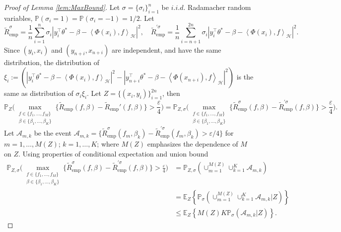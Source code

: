 \documentclass[twoside, onecolumn]{article}
\def\E{\mathbb{E}}
\def\Hcal{\mathcal{H}}
\def\Acal{\mathcal{A}}
\def\Hcal{\mathcal{H}}
\begin{document}
\begin{proof}[Proof of Lemma \ref{lem:MaxBound}]
 Let $\sigma = \{\sigma_i\}_{i=1}^n$ be $i.i.d.$ Radamacher random variables,  $\mathbb{P}(\sigma_i=1)=\mathbb{P}(\sigma_i=-1)=1/2$. Let $$
 \widetilde{R}_{\text{emp}}^{\sigma}=
 \frac{1}{n}\sum_{i=1}^{n}\sigma_{i}|y_i^{\top}\theta^*-\beta-\left<\Phi(x_i),f\right>_\Hcal|^{2}, \quad \widetilde{R}_{\text{emp}}^{'\sigma}=
  \frac{1}{n}\sum_{i=n+1}^{2n}\sigma_{i}|y_i^{\top}\theta^*-\beta-\left<\Phi(x_i),f\right>_\Hcal|^{2}.
 $$
Since $(y_i, x_i)$ and $(y_{n+i}, x_{n+i})$ are independent, and have the same distribution, the distribution of $\xi_{i}:=(|y_{i}^\top \theta^*-\beta-\left<\Phi(x_{i}), f\right>_\Hcal|^{2}-
|y_{n+i}^\top\theta^*-\beta-\left<\Phi(x_{n+i}), f\right>_\Hcal|^{2})$ is the same as distribution of $\sigma_i\xi_i$. Let $Z=\{(x_i, y_i)\}_{i=1}^{2n}$, then
\[
\mathbb{P}_Z\bigg( 
\max_{\substack{f\in \{f_1, \dots, f_M\}\\ \beta\in \{\beta_1, \dots, \beta_K\}}}
\{\widetilde{R}_{\text{emp}}(f,\beta)-\widetilde{R}_{\text{emp}}'(f,\beta)\}>\frac{\varepsilon}{4}
\bigg)=\mathbb{P}_{Z,\sigma}\bigg(\max_{\substack{f\in \{f_1, \dots, f_M\}\\\beta\in \{\beta_1, \dots, \beta_K\}}}\{\widetilde{R}_{\text{emp}}^{\sigma}(f,\beta)-\widetilde{R}_{\text{emp}}^{'\sigma}(f,\beta)\}>\frac{\varepsilon}{4}\bigg).
\]
Let $\Acal_{m,k}$ be the event $\Acal_{m,k} = \{\widetilde{R}_{\text{emp}}^{\sigma}(f_m,\beta_k)-\widetilde{R}_{\text{emp}}^{'\sigma}(f_m,\beta_k) > \varepsilon/4\}$ for $m=1,\dots,M(Z)$; $k=1,\dots, K$; where $M(Z)$ emphasizes the dependence of $M$ on $Z$. Using properties of conditional expectation and union bound
\begin{align*}
\mathbb{P}_{Z,\sigma}\bigg(\max_{\substack{f\in \{f_1, \dots, f_M\}\\\beta\in \{\beta_1, \dots, \beta_K\}}}\{\widetilde{R}_{\text{emp}}^{\sigma}(f,\beta)-\widetilde{R}_{\text{emp}}^{'\sigma}(f,\beta)\}>\frac{\varepsilon}{4}\bigg) &= \mathbb{P}_{Z, \sigma}(\cup_{m=1}^{M(Z)}\cup_{k=1}^K \Acal_{m,k})\\
&=\E_{Z}\left\{\mathbb{P}_{\sigma}(\cup_{m=1}^{M(Z)}\cup_{k=1}^K \Acal_{m,k}|Z)\right\}\\
&\leq \E_Z\left\{M(Z)K\mathbb{P}_{\sigma}(\Acal_{m,k}|Z)\right\}.
\end{align*}


\end{proof}
\end{document}
